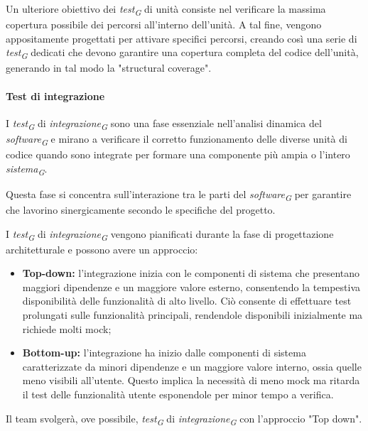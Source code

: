 Un ulteriore obiettivo dei \textit{test}\textsubscript{\textit{G}} di unità consiste nel verificare la massima copertura possibile dei percorsi all'interno dell'unità. A tal fine, vengono appositamente progettati per attivare specifici percorsi, creando così una serie di \textit{test}\textsubscript{\textit{G}} dedicati che devono garantire una copertura completa del codice dell'unità, generando in tal modo la "structural coverage".
 
\paragraph{Test di integrazione}
I \textit{test}\textsubscript{\textit{G}} di \textit{integrazione}\textsubscript{\textit{G}} sono una fase essenziale nell'analisi dinamica del \textit{software}\textsubscript{\textit{G}} e mirano a verificare il corretto funzionamento delle diverse unità di codice quando sono integrate per formare una componente più ampia o l'intero \textit{sistema}\textsubscript{\textit{G}}. 

Questa fase si concentra sull'interazione tra le parti del \textit{software}\textsubscript{\textit{G}} per garantire che lavorino sinergicamente secondo le specifiche del progetto.

I \textit{test}\textsubscript{\textit{G}} di \textit{integrazione}\textsubscript{\textit{G}} vengono pianificati durante la fase di progettazione architetturale e possono avere un approccio: 

\begin{itemize}
    \item \textbf{Top-down:}
        l'integrazione inizia con le componenti di sistema che presentano maggiori dipendenze e un maggiore valore esterno, consentendo la tempestiva disponibilità delle funzionalità di alto livello. Ciò consente di effettuare test prolungati sulle funzionalità principali, rendendole disponibili inizialmente ma richiede molti mock;
    \item \textbf{Bottom-up:}
        l'integrazione ha inizio dalle componenti di sistema caratterizzate da minori dipendenze e un maggiore valore interno, ossia quelle meno visibili all'utente. Questo implica la necessità di meno mock ma ritarda il test delle funzionalità utente esponendole per minor tempo a verifica.
\end{itemize}

Il team svolgerà, ove possibile, \textit{test}\textsubscript{\textit{G}} di \textit{integrazione}\textsubscript{\textit{G}} con l'approccio "Top down". 

